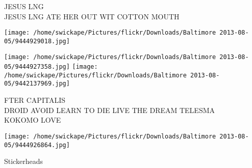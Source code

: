 \documentclass[10pt,letterpaper]{article}
\begin{document}
JESUS LNG\\
JESUS LNG ATE HER OUT WIT COTTON MOUTH
\pagebreak

\texttt{[image: /home/swickape/Pictures/flickr/Downloads/Baltimore 2013-08-05/9444929018.jpg]}

\vspace{0.25in}
\texttt{[image: /home/swickape/Pictures/flickr/Downloads/Baltimore 2013-08-05/9444927358.jpg]}
\texttt{[image: /home/swickape/Pictures/flickr/Downloads/Baltimore 2013-08-05/9442137969.jpg]}

FTER CAPITALIS\\
DROID AVOID LEARN TO DIE LIVE THE DREAM TELESMA\\
KOKOMO LOVE
\pagebreak

\texttt{[image: /home/swickape/Pictures/flickr/Downloads/Baltimore 2013-08-05/9444926864.jpg]}

Stickerheads
\pagebreak
\end{document}
